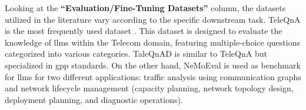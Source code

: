 %
Looking at the \textbf{``Evaluation/Fine-Tuning Datasets''} column, the datasets utilized in the literature vary according to the specific downstream task. 
TeleQnA is the most frequently used dataset \cite{roychowdhury2024unlocking, ahmed2021ecu, piovesan2024telecom, erak2024leveraging}. 
%
This dataset is designed to evaluate the knowledge of \glspl{llm} within the Telecom domain, featuring multiple-choice questions categorized into various categories. 
TaleQnAD \cite{karapantelakis2024using} is similar to TeleQnA but specialized in \gls{gpp} standards.
On the other hand, NeMoEval \cite{mani2023enhancing} is used as benchmark for \glspl{llm} for two different applications:
traffic analysis using communication graphs and
network lifecycle management (\eg capacity planning, network topology design, deployment planning, and diagnostic operations).

